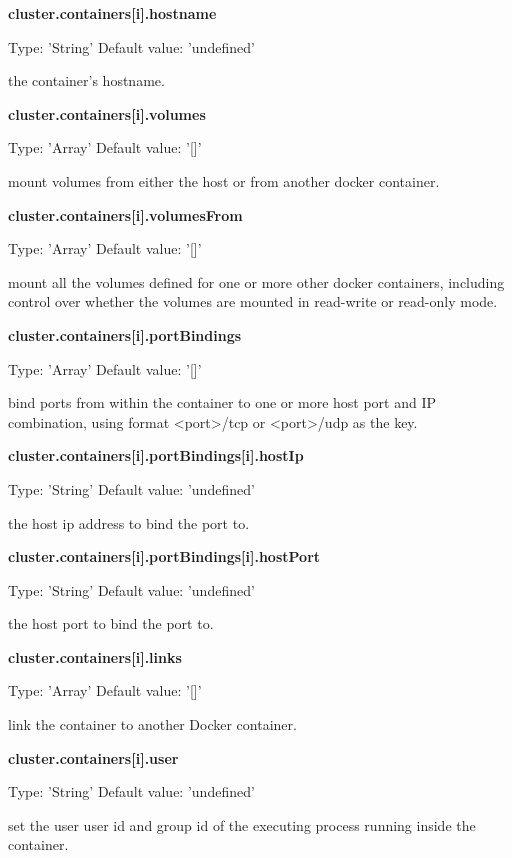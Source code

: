 \documentclass[a4paper,11pt,twoside]{report}
\begin{document}
\noindent
\textbf{cluster.containers[i].hostname}

\noindent
Type: 'String' Default value: 'undefined'\smallskip

\noindent 
the container's hostname.\bigskip

\noindent
\textbf{cluster.containers[i].volumes}

\noindent
Type: 'Array' Default value: '[]'\smallskip

\noindent 
mount volumes from either the host or from another docker container.\bigskip

\noindent
\textbf{cluster.containers[i].volumesFrom}

\noindent
Type: 'Array' Default value: '[]'\smallskip

\noindent 
mount all the volumes defined for one or more other docker containers, including control over whether the volumes are mounted in read-write or read-only mode.\bigskip

\noindent
\textbf{cluster.containers[i].portBindings}

\noindent
Type: 'Array' Default value: '[]'\smallskip

\noindent 
bind ports from within the container to one or more host port and IP combination, using format <port>/tcp or <port>/udp as the key.\bigskip

\noindent
\textbf{cluster.containers[i].portBindings[i].hostIp}

\noindent
Type: 'String' Default value: 'undefined'\smallskip

\noindent 
the host ip address to bind the port to.\bigskip

\noindent
\textbf{cluster.containers[i].portBindings[i].hostPort}

\noindent
Type: 'String' Default value: 'undefined'\smallskip

\noindent 
the host port to bind the port to.\bigskip

\noindent
\textbf{cluster.containers[i].links}

\noindent
Type: 'Array' Default value: '[]'\smallskip

\noindent 
link the container to another Docker container.\bigskip

\noindent
\textbf{cluster.containers[i].user}

\noindent
Type: 'String' Default value: 'undefined'\smallskip

\noindent 
set the user user id and group id of the executing process running inside the container.\bigskip
\end{document}

